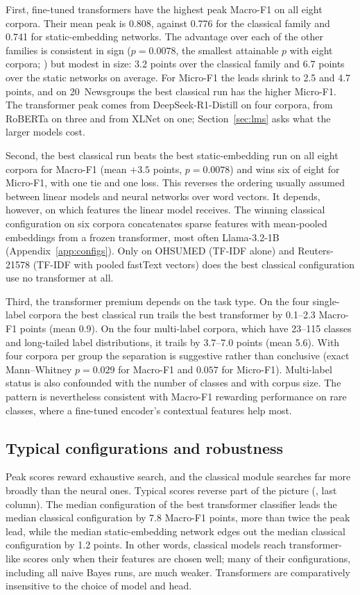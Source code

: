 \documentclass{ijis}
\begin{document}
First, fine-tuned transformers have the highest peak Macro-F1 on all eight corpora. Their mean peak is 0.808, against 0.776 for the classical family and 0.741 for static-embedding networks. The advantage over each of the other families is consistent in sign ($p = 0.0078$, the smallest attainable $p$ with eight corpora; ) but modest in size: 3.2 points over the classical family and 6.7 points over the static networks on average. For Micro-F1 the leads shrink to 2.5 and 4.7 points, and on 20~Newsgroups the best classical run has the higher Micro-F1. The transformer peak comes from DeepSeek-R1-Distill on four corpora, from RoBERTa on three and from XLNet on one; Section~\ref{sec:lms} asks what the larger models cost.

Second, the best classical run beats the best static-embedding run on all eight corpora for Macro-F1 (mean $+3.5$ points, $p = 0.0078$) and wins six of eight for Micro-F1, with one tie and one loss. This reverses the ordering usually assumed between linear models and neural networks over word vectors. It depends, however, on which features the linear model receives. The winning classical configuration on six corpora concatenates sparse features with mean-pooled embeddings from a frozen transformer, most often Llama-3.2-1B (Appendix~\ref{app:configs}). Only on OHSUMED (TF-IDF alone) and Reuters-21578 (TF-IDF with pooled fastText vectors) does the best classical configuration use no transformer at all.

Third, the transformer premium depends on the task type. On the four single-label corpora the best classical run trails the best transformer by 0.1--2.3 Macro-F1 points (mean 0.9). On the four multi-label corpora, which have 23--115 classes and long-tailed label distributions, it trails by 3.7--7.0 points (mean 5.6). With four corpora per group the separation is suggestive rather than conclusive (exact Mann--Whitney $p = 0.029$ for Macro-F1 and $0.057$ for Micro-F1). Multi-label status is also confounded with the number of classes and with corpus size. The pattern is nevertheless consistent with Macro-F1 rewarding performance on rare classes, where a fine-tuned encoder's contextual features help most.

\subsection{Typical configurations and robustness}\label{sec:typical}

Peak scores reward exhaustive search, and the classical module searches far more broadly than the neural ones. Typical scores reverse part of the picture (, last column). The median configuration of the best transformer classifier leads the median classical configuration by 7.8 Macro-F1 points, more than twice the peak lead, while the median static-embedding network edges out the median classical configuration by 1.2 points. In other words, classical models reach transformer-like scores only when their features are chosen well; many of their configurations, including all naive Bayes runs, are much weaker. Transformers are comparatively insensitive to the choice of model and head.
\end{document}
